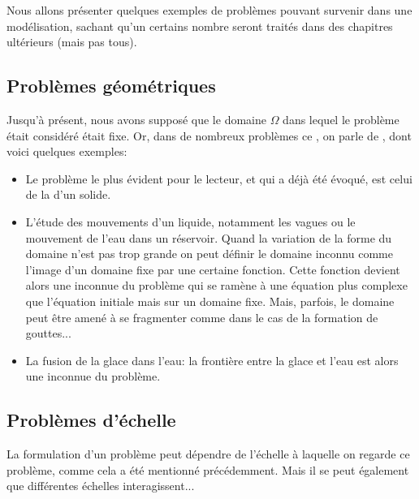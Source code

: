 \medskip
Nous allons présenter quelques exemples de problèmes pouvant survenir
dans une modélisation, sachant qu'un certains nombre seront traités dans des
chapitres ultérieurs (mais pas tous).

\medskip
\subsection{Problèmes géométriques}
Jusqu'à présent, nous avons supposé que le domaine $\Omega$ dans lequel le problème
était considéré était fixe.
Or, dans de nombreux problèmes ce , on parle de
, dont voici quelques exemples:
\begin{itemize}
\item Le problème le plus évident pour le lecteur, et qui a déjà été évoqué, est celui de la  d'un solide.
\item L'étude des mouvements d'un liquide, notamment les vagues ou le mouvement de l'eau
	dans un réservoir.
	Quand la variation de la forme du domaine n'est pas trop grande on peut définir
	le domaine inconnu comme l'image d'un domaine fixe par une certaine fonction.
	Cette fonction devient alors une inconnue du problème qui se ramène à une équation
	plus complexe que l'équation initiale mais sur un domaine fixe.
	Mais, parfois, le domaine peut être amené à se fragmenter comme dans le cas de la
	formation de gouttes...
  \item La fusion de la glace dans l'eau: la frontière entre la glace et l'eau est alors une inconnue
	du problème.
\end{itemize}

\medskip
\subsection{Problèmes d'échelle}
La formulation d'un problème peut dépendre de l'échelle à laquelle on regarde
ce problème, comme cela a été mentionné précédemment.
Mais il se peut également que différentes échelles interagissent...

